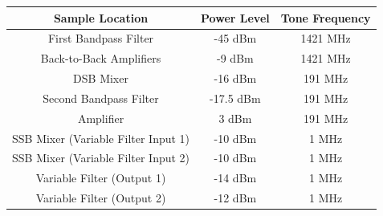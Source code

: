 \documentclass[11pt]{article}
\begin{document}
\begin{center}
    \begin{tabular}{ c | c | c }
        \label{tab:power-levels}
        \textbf{Sample Location} & \textbf{Power Level} & \textbf{Tone 
        Frequency} \\
        \hline
        First Bandpass Filter & -45 dBm & 1421 MHz \\
        \hline
        Back-to-Back Amplifiers & -9 dBm & 1421 MHz \\
        \hline
        DSB Mixer & -16 dBm & 191 MHz \\
        \hline
        Second Bandpass Filter & -17.5 dBm & 191 MHz \\
        \hline
        Amplifier & 3 dBm & 191 MHz \\
        \hline
        SSB Mixer (Variable Filter Input 1) & -10 dBm & 1 MHz \\
        \hline
        SSB Mixer (Variable Filter Input 2) & -10 dBm & 1 MHz \\
        \hline
        Variable Filter (Output 1) & -14 dBm & 1 MHz \\
        \hline
        Variable Filter (Output 2) & -12 dBm & 1 MHz \\
    \end{tabular}
\end{center}
\end{document}
